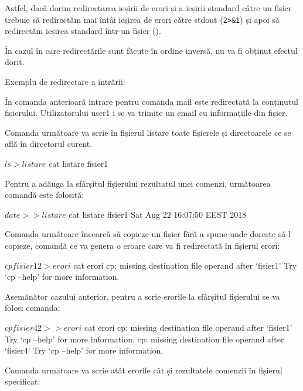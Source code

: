 Astfel, dacă dorim redirectarea ieșirii de erori și a ieșirii standard către un
fișier trebuie să redirectăm mai întâi ieșirea de erori către stdout
(\texttt{2>\&1}) și apoi să redirectăm ieșirea standard într-un fișier
().

În cazul în care redirectările sunt făcute în ordine inversă, nu va fi obținut
efectul dorit.

Exemplu de redirectare a intrării:


În comanda anterioară intrare pentru comanda mail este redirectată la conținutul
fișierului.  Utilizatorului user1 i se va trimite un email cu informațiile din
fișier.

Comanda următoare va scrie în fișierul listare toate fișierele și directoarele
ce se află în directorul curent.

\begin{screen}
$ ls > listare
$ cat listare
fisier1
\end{screen}

Pentru a adăuga la sfârșitul fișierului rezultatul unei comenzi, următoarea
comandă este folosită:

\begin{screen}
$ date >> listare
$ cat listare
fisier1
Sat Aug 22 16:07:50 EEST 2018
\end{screen}

Comanda următoare încearcă să copieze un fișier fără a spune unde dorește să-l
copieze, comandă ce va genera o eroare care va fi redirectată în fișierul erori:

\begin{screen}
$ cp fisier1 2> erori
$ cat erori
cp: missing destination file operand after `fisier1'
Try `cp --help' for more information.
\end{screen}

Asemănător cazului anterior, pentru a scrie erorile la sfârșitul fișierului se
va folosi comanda:

\begin{screen}
$ cp fisier4 2>> erori
$ cat erori
cp: missing destination file operand after `fisier1'
Try `cp --help' for more information.
cp: missing destination file operand after `fisier4'
Try `cp --help' for more information.
\end{screen}

Comanda următoare va scrie atât erorile cât și rezultatele comenzii  în
fișierul specificat:

